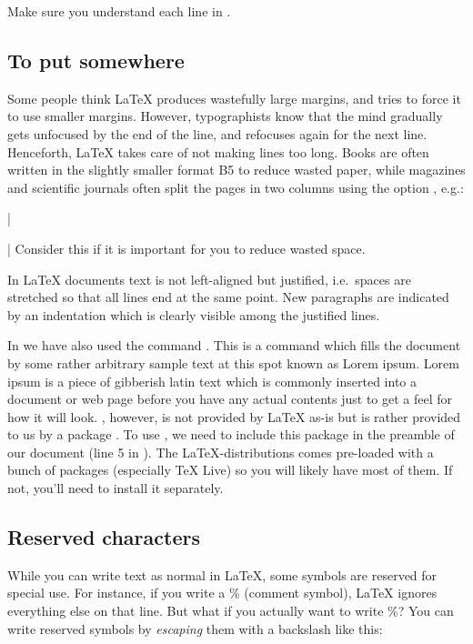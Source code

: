 Make sure you understand each line in . 

\subsection{To put somewhere}

Some people think \LaTeX{} produces wastefully large margins, and tries to force it to use smaller margins. However, typographists know that the mind gradually gets unfocused by the end of the line, and refocuses again for the next line. Henceforth, \LaTeX{} takes care of not making lines too long. Books are often written in the slightly smaller format B5 to reduce wasted paper, while magazines and scientific journals often split the pages in two columns using the option , e.g.:

\latexone|\usepackage[a4paper,twocolumn]{article}|
\noindent Consider this if it is important for you to reduce wasted space.


In \LaTeX{} documents text is not left-aligned but justified, i.e.\ spaces are stretched so that all lines end at the same point. New paragraphs are indicated by an indentation which is clearly visible among the justified lines.

In  we have also used the command \latexin{\lipsum}. This is a command which fills the document by some rather arbitrary sample text at this spot known as Lorem ipsum. Lorem ipsum is a piece of gibberish latin text which is commonly inserted into a document or web page before you have any actual contents just to get a feel for how it will look. \latexin{\lipsum}, however, is not provided by \LaTeX{} as-is but is rather provided to us by a package . To use \latexin{\lipsum}, we need to include this package in the preamble of our document (line 5 in ). The \LaTeX{}-distributions comes pre-loaded with a bunch of packages (especially TeX Live) so you will likely have most of them. If not, you'll need to install it separately.

\subsection{Reserved characters}
While you can write text as normal in \LaTeX{}, some symbols are reserved for special use. For instance, if you write a \% (comment symbol), \LaTeX{} ignores everything else on that line. But what if you actually want to write \%? You can write reserved symbols by \emph{escaping} them with a backslash like this:

